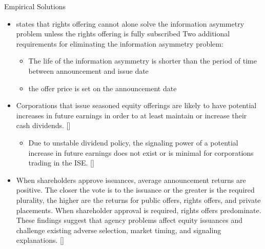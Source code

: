 \documentclass{beamer}
\begin{document}
\begin{frame}{Empirical Solutions}
	\begin{itemize}
		\tiny
		 \item \cite{loderer1988stock} states that rights offering cannot alone solve the  information asymmetry problem unless the rights offering is fully subscribed
		  Two additional requirements for eliminating the information asymmetry problem:
		 \begin{itemize}\tiny
		 	\item The life of the information asymmetry is shorter than the period of time
		 	between announcement and issue date
		 	\item  the offer price is set on the announcement date
		 \end{itemize}
	 \item Corporations that  issue seasoned equity offerings are likely to have potential increases in future earnings in order to at least maintain or increase their cash dividends. [\cite{lasfer1997motivation}]
	 \begin{itemize}\tiny
	 	\item Due to unstable dividend policy, the signaling power of a potential increase in future earnings does not exist or is minimal
	 	for corporations trading in the ISE. [\cite{adaoglu2006market}]
	 \end{itemize}
		 \item 
		 When shareholders approve issuances, average announcement returns are positive. The closer the vote is to the issuance or the greater is the required plurality, the higher
		 are the returns for public offers, rights offers, and private placements. When shareholder
		 approval is required, rights offers predominate. These findings suggest that agency problems affect equity issuances and challenge existing adverse selection, market timing, and signaling explanations. [\cite{holderness2018equity}]
	\end{itemize}
\end{frame}
\end{document}
